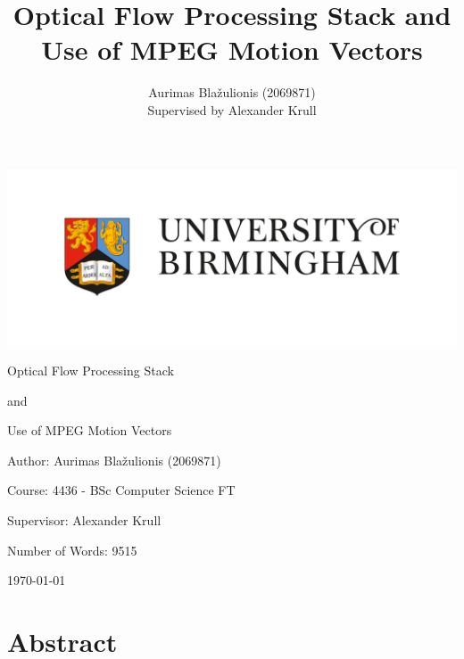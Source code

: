 \documentclass[11pt,english]{report}
\author{
	Aurimas Blažulionis (2069871)\\
	Supervised by Alexander Krull
}
\title{Optical Flow Processing Stack and Use of MPEG Motion Vectors}
\begin{document}
\thispagestyle{empty}

\vspace*{1cm}

\begin{centering}

\includegraphics[width=500pt]{docs/report/uob.jpg}

\Huge{Optical Flow Processing Stack}

\huge{and}

\huge{Use of MPEG Motion Vectors}

\end{centering}

\vfill

{

\Large{Author: Aurimas Blažulionis (2069871)}

\Large{Course: 4436 - BSc Computer Science FT}

\Large{Supervisor: Alexander Krull}

\Large{Number of Words: 9515}

\Large{\today}

}

\vspace*{0.2cm}

\clearpage

\section*{Abstract}
\end{document}
